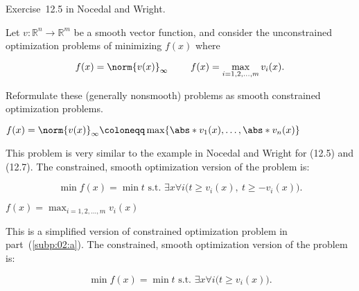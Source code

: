 \begin{problem}\label{prob:02}%
  Exercise~12.5 in Nocedal and Wright.
  
  Let $v:\mathbb{R}^n \rightarrow \mathbb{R}^m$ be a smooth vector function, and consider the unconstrained optimization problems of minimizing $f(x)$ where
  
  \[f(x)=\norm{v(x)}_{\infty}~~~~~~~f(x)=\max_{i=1,2,\ldots,m}v_i(x)\text{.}\]
  
  \noindent
  Reformulate these (generally nonsmooth) problems as smooth constrained optimization problems.
\end{problem}

\begin{subproblem}\label{subp:02:a}%
  $f(x)=\norm{v(x)}_{\infty} \coloneqq \max\{\abs*{v_1(x)},\ldots,\abs*{v_n(x)}\}$
\end{subproblem}

This problem is very similar to the example in Nocedal and Wright for (12.5) and (12.7).  The constrained, smooth optimization version of the problem is:

\[\min f(x) = \min t \text{ s.t.\ } \exists x \forall i \big( t \ge v_i(x), ~ t \ge -v_i(x)\big)  \text{.}\]

\begin{subproblem}
  $f(x)=\max_{i=1,2,\ldots,m}v_i(x)$
\end{subproblem}

This is a simplified version of constrained optimization problem in part~(\ref{subp:02:a}).  The constrained, smooth optimization version of the problem is:

\[\min f(x) = \min t \text{ s.t.\ } \exists x \forall i \big( t \ge v_i(x) \big) \text{.}\]
